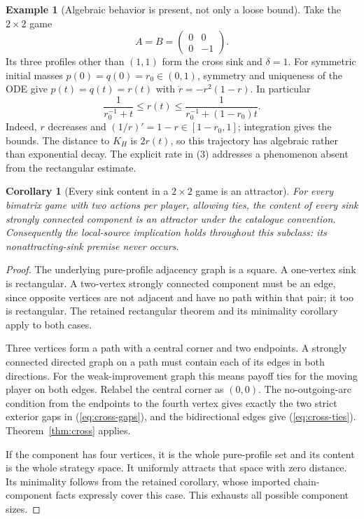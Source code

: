 \documentclass[11pt]{article}
\newtheorem{corollary}{Corollary}
\theoremstyle{definition}
\newtheorem{example}{Example}
\theoremstyle{remark}
\begin{document}
\begin{example}[Algebraic behavior is present, not only a loose bound]
Take the $2\times2$ game
\[
 A=B=\begin{pmatrix}0&0\\0&-1\end{pmatrix}.
\]
Its three profiles other than $(1,1)$ form the cross sink and $\delta=1$.
For symmetric initial masses $p(0)=q(0)=r_0\in(0,1)$, symmetry and uniqueness
of the ODE give $p(t)=q(t)=r(t)$ with
$\dot r=-r^2(1-r)$. In particular
\[
 \frac1{r_0^{-1}+t}\leq r(t)
 \leq\frac1{r_0^{-1}+(1-r_0)t}.
\]
Indeed, $r$ decreases and $(1/r)'=1-r\in[1-r_0,1]$; integration gives the
bounds. The distance to $K_H$ is $2r(t)$, so this trajectory has algebraic
rather than exponential decay. The explicit rate in (3) addresses a
phenomenon absent from the rectangular estimate.
\end{example}

\begin{corollary}[Every sink content in a $2\times2$ game is an attractor]
For every bimatrix game with two actions per player, allowing ties, the
content of every sink strongly connected component is an attractor under
the catalogue convention. Consequently the local-source implication holds
throughout this subclass: its nonattracting-sink premise never occurs.
\end{corollary}
\begin{proof}
The underlying pure-profile adjacency graph is a square. A one-vertex sink
is rectangular. A two-vertex strongly connected component must be an edge,
since opposite vertices are not adjacent and have no path within that
pair; it too is rectangular. The retained rectangular theorem and its
minimality corollary apply to both cases.

Three vertices form a path with a central corner and two endpoints. A
strongly connected directed graph on a path must contain each of its edges
in both directions. For the weak-improvement graph this means payoff ties
for the moving player on both edges. Relabel the central corner as $(0,0)$.
The no-outgoing-arc condition from the endpoints to the fourth vertex gives
exactly the two strict exterior gaps in
(\ref{eq:cross-gaps}), and the bidirectional edges give
(\ref{eq:cross-ties}). Theorem~\ref{thm:cross} applies.

If the component has four vertices, it is the whole pure-profile set and
its content is the whole strategy space. It uniformly attracts that space
with zero distance. Its minimality follows from the retained corollary,
whose imported chain-component facts expressly cover this case. This
exhausts all possible component sizes.
\end{proof}
\end{document}
